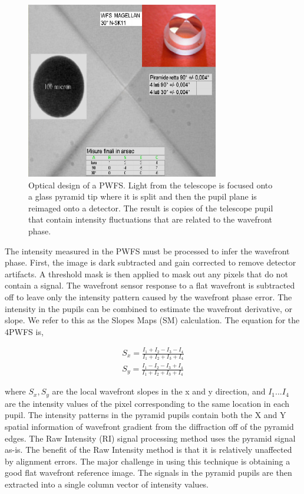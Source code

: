 \begin{figure}
    \centering
    \includegraphics[width=0.75\textwidth]{Chapter Materials/Chapter Three Materials/pyramid.png}
    \caption{Optical design of a PWFS. Light from the telescope is focused onto a glass pyramid tip where it is split and then the pupil plane is reimaged onto a detector. The result is copies of the telescope pupil that contain intensity fluctuations that are related to the wavefront phase. \cite{pyramidfig}}
    \label{fig:pyramid}
\end{figure}


The intensity measured in the PWFS must be processed to infer the wavefront phase. First, the image is dark subtracted and gain corrected to remove detector artifacts. A threshold mask is then applied to mask out any pixels that do not contain a signal. The wavefront sensor response to a flat wavefront is subtracted off to leave only the intensity pattern caused by the wavefront phase error. The intensity in the pupils can be combined to estimate the wavefront derivative, or slope. We refer to this as the Slopes Maps (SM) calculation. The equation for the 4PWFS is,


\begin{eqnarray}
    S_x=\frac{I_1+I_2-I_3-I_4}{I_1+I_2+I_3+I_4}     \label{4PWFSslopes} \\
    S_y=\frac{I_1-I_2-I_3+I_4}{I_1+I_2+I_3+I_4} \nonumber
\end{eqnarray}

where $S_x, S_y$ are the local wavefront slopes in the x and y direction, and $I_1...I_4$ are the intensity values of the pixel corresponding to the same location in each pupil. The intensity patterns in the pyramid pupils contain both the X and Y spatial information of wavefront gradient from the diffraction off of the pyramid edges. The Raw Intensity (RI) signal processing method uses the pyramid signal as-is. The benefit of the Raw Intensity method is that it is relatively unaffected by alignment errors. The major challenge in using this technique is obtaining a good flat wavefront reference image. The signals in the pyramid pupils are then extracted into a single column vector of intensity values.

